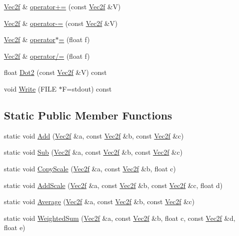 \begin{DoxyCompactItemize}
\item 
\hyperlink{classVec2f}{Vec2f} \& \hyperlink{classVec2f_afcf9b0267e8e4bc489e92536d2a59f94}{operator+=} (const \hyperlink{classVec2f}{Vec2f} \&V)
\item 
\hyperlink{classVec2f}{Vec2f} \& \hyperlink{classVec2f_a7617681b3e723a3e079a7ac9aa1cd5b8}{operator-\/=} (const \hyperlink{classVec2f}{Vec2f} \&V)
\item 
\hyperlink{classVec2f}{Vec2f} \& \hyperlink{classVec2f_a90602c3e9acd18762a488ed2a8393f61}{operator$\ast$=} (float f)
\item 
\hyperlink{classVec2f}{Vec2f} \& \hyperlink{classVec2f_a37cc7be7b91f340669d513e287974eff}{operator/=} (float f)
\item 
float \hyperlink{classVec2f_a827b91f7366c14666cdbb14d471a8aab}{Dot2} (const \hyperlink{classVec2f}{Vec2f} \&V) const 
\item 
void \hyperlink{classVec2f_af423b0af426c519e9301e83f62afe14e}{Write} (F\+I\+L\+E $\ast$F=stdout) const 
\end{DoxyCompactItemize}
\subsection*{Static Public Member Functions}
\begin{DoxyCompactItemize}
\item 
static void \hyperlink{classVec2f_aaa72e50ede2f02d9cbfead98966a6a10}{Add} (\hyperlink{classVec2f}{Vec2f} \&a, const \hyperlink{classVec2f}{Vec2f} \&b, const \hyperlink{classVec2f}{Vec2f} \&c)
\item 
static void \hyperlink{classVec2f_aa3efb59c19587d81ec7ad53ecf12226d}{Sub} (\hyperlink{classVec2f}{Vec2f} \&a, const \hyperlink{classVec2f}{Vec2f} \&b, const \hyperlink{classVec2f}{Vec2f} \&c)
\item 
static void \hyperlink{classVec2f_a32c4b20a2c2b5fae581a4eeae4316c47}{Copy\+Scale} (\hyperlink{classVec2f}{Vec2f} \&a, const \hyperlink{classVec2f}{Vec2f} \&b, float c)
\item 
static void \hyperlink{classVec2f_a80a502fea4f66b921c84019829128ff1}{Add\+Scale} (\hyperlink{classVec2f}{Vec2f} \&a, const \hyperlink{classVec2f}{Vec2f} \&b, const \hyperlink{classVec2f}{Vec2f} \&c, float d)
\item 
static void \hyperlink{classVec2f_ab8bb3386b3363f60cf814fb289528c16}{Average} (\hyperlink{classVec2f}{Vec2f} \&a, const \hyperlink{classVec2f}{Vec2f} \&b, const \hyperlink{classVec2f}{Vec2f} \&c)
\item 
static void \hyperlink{classVec2f_aec7c624674de97ca3cdf2a895d0c1495}{Weighted\+Sum} (\hyperlink{classVec2f}{Vec2f} \&a, const \hyperlink{classVec2f}{Vec2f} \&b, float c, const \hyperlink{classVec2f}{Vec2f} \&d, float e)
\end{DoxyCompactItemize}



